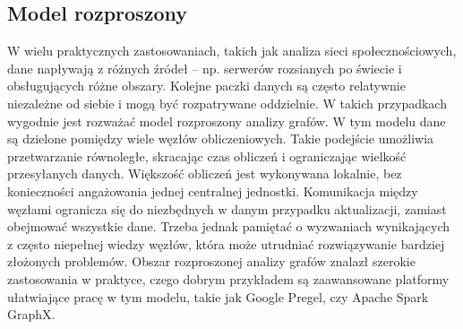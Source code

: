     \subsection{Model rozproszony}
        W wielu praktycznych zastosowaniach, takich jak analiza sieci społecznościowych, dane napływają z różnych źródeł -- np. serwerów rozsianych po świecie i obsługujących różne obszary. Kolejne paczki danych są często relatywnie niezależne od siebie i mogą być rozpatrywane oddzielnie. W takich przypadkach wygodnie jest rozważać model rozproszony analizy grafów. W tym modelu dane są dzielone pomiędzy wiele węzłów obliczeniowych. Takie podejście umożliwia przetwarzanie równoległe, skracając czas obliczeń i ograniczając wielkość przesyłanych danych. Większość obliczeń jest wykonywana lokalnie, bez konieczności angażowania jednej centralnej jednostki. Komunikacja między węzłami ogranicza się do niezbędnych w danym przypadku aktualizacji, zamiast obejmować wszystkie dane. Trzeba jednak pamiętać o wyzwaniach wynikających z często niepełnej wiedzy węzłów, która może utrudniać rozwiązywanie bardziej złożonych problemów. Obszar rozproszonej analizy grafów znalazł szerokie zastosowania w praktyce, czego dobrym przykładem są zaawansowane platformy ułatwiające pracę w tym modelu, takie jak Google Pregel\cite{Malewicz_Austern_Bik_Dehnert_Horn_Leiser_Czajkowski_2010}, czy Apache Spark GraphX\cite{Xin_Gonzalez_Franklin_Stoica_2013}. 